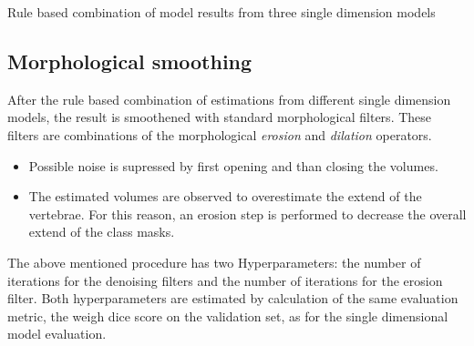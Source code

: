\begin{algorithm}[H]
    \SetAlgoLined
   \caption{Rule based combination of model results from three single dimension models}
\end{algorithm}


\subsection{Morphological smoothing}
After the rule based combination of estimations from different single dimension models, the result is smoothened with standard morphological filters.
These filters are combinations of the morphological \textit{erosion} and \textit{dilation} operators.
\begin{itemize}
    \item Possible noise is supressed by first opening and than closing the volumes.
    \item The estimated volumes are observed to overestimate the extend of the vertebrae. For this reason, an erosion step is performed to decrease the overall extend of the class masks.
\end{itemize}

The above mentioned procedure has two Hyperparameters: the number of iterations for the denoising filters and the number of iterations for the erosion filter.
Both hyperparameters are estimated by calculation of the same evaluation metric, the weigh dice score on the validation set, as for the single dimensional model evaluation. 


